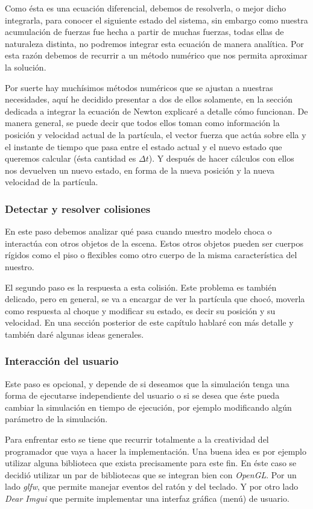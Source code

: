 Como ésta es una ecuación diferencial, debemos de resolverla, o mejor dicho integrarla, para conocer el siguiente estado del sistema, sin embargo como nuestra acumulación de fuerzas fue hecha a partir de muchas fuerzas, todas ellas de naturaleza distinta, no podremos integrar esta ecuación de manera analítica.
Por esta razón debemos de recurrir a un método numérico que nos permita aproximar la solución.

Por suerte hay muchísimos métodos numéricos que se ajustan a nuestras necesidades, aquí he decidido presentar a dos de ellos solamente, en la sección dedicada a integrar la ecuación de Newton explicaré a detalle cómo funcionan.
De manera general, se puede decir que todos ellos toman como información la posición y velocidad actual de la partícula, el vector fuerza que actúa sobre ella y el instante de tiempo que pasa entre el estado actual y el nuevo estado que queremos calcular (ésta cantidad es $\Delta t$).
Y después de hacer cálculos con ellos nos devuelven un nuevo estado, en forma de la nueva posición y la nueva velocidad de la partícula.

\subsubsection{Detectar y resolver colisiones}
En este paso debemos analizar qué pasa cuando nuestro modelo choca o interactúa con otros objetos de la escena.
Estos otros objetos pueden ser cuerpos rígidos como el piso o flexibles como otro cuerpo de la misma característica del nuestro.

El segundo paso es la respuesta a esta colisión.
Este problema es también delicado, pero en general, se va a encargar de ver la partícula que chocó, moverla como respuesta al choque y modificar su estado, es decir su posición y su velocidad.
En una sección posterior de este capítulo hablaré con más detalle y también daré algunas ideas generales.

\subsubsection{Interacción del usuario}
Este paso es opcional, y depende de si deseamos que la simulación tenga una forma de ejecutarse independiente del usuario o si se desea que éste pueda cambiar la simulación en tiempo de ejecución, por ejemplo modificando algún parámetro de la simulación.

Para enfrentar esto se tiene que recurrir totalmente a la creatividad del programador que vaya a hacer la implementación.
Una buena idea es por ejemplo utilizar alguna biblioteca que exista precisamente para este fin. En éste caso se decidió utilizar un par de bibliotecas que se integran bien con \emph{\textenglish{OpenGL}}.
Por un lado \emph{\textenglish{glfw}}, que permite manejar eventos del ratón y del teclado. 
Y por otro lado \emph{\textenglish{Dear Imgui}} que permite implementar una interfaz gráfica (menú) de usuario.

